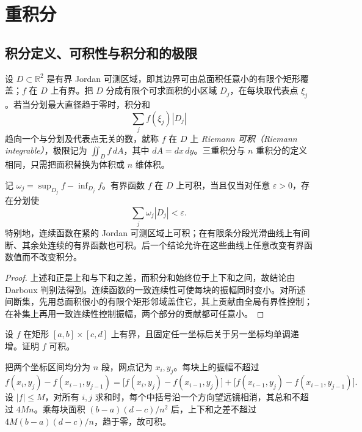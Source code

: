 \section{重积分}
\label{sec:pei-multiple-integrals}

\subsection{积分定义、可积性与积分和的极限}

设 $D\subset\mathbb R^2$ 是有界 Jordan 可测区域，即其边界可由总面积任意小的有限个矩形覆盖；$f$ 在 $D$ 上有界。把 $D$ 分成有限个可求面积的小区域 $D_j$，在每块取代表点 $\xi_j$。若当分划最大直径趋于零时，积分和
\[
\sum_j f(\xi_j)|D_j|
\]
趋向一个与分划及代表点无关的数，就称 $f$ 在 $D$ 上 \emph{Riemann 可积（Riemann integrable）}，极限记为 $\iint_Df\,dA$，其中 $dA=dx\,dy$。三重积分与 $n$ 重积分的定义相同，只需把面积替换为体积或 $n$ 维体积。

\begin{proposition}
\label{prop:pei-darboux-integrable}
记 $\omega_j=\sup_{D_j}f-\inf_{D_j}f$。有界函数 $f$ 在 $D$ 上可积，当且仅当对任意 $\varepsilon>0$，存在分划使
\[
\sum_j\omega_j|D_j|<\varepsilon.
\]
特别地，连续函数在紧的 Jordan 可测区域上可积；在有限条分段光滑曲线上有间断、其余处连续的有界函数也可积。后一个结论允许在这些曲线上任意改变有界函数值而不改变积分。
\end{proposition}
\begin{proof}
上述和正是上和与下和之差，而积分和始终位于上下和之间，故结论由 Darboux 判别法得到。连续函数的一致连续性可使每块的振幅同时变小。对所述间断集，先用总面积很小的有限个矩形邻域盖住它，其上贡献由全局有界性控制；在补集上再用一致连续性控制振幅，两个部分的贡献都可任意小。
\end{proof}

\begin{example}
\label{ex:pei-monotone-double-integrable}
设 $f$ 在矩形 $[a,b]\times[c,d]$ 上有界，且固定任一坐标后关于另一坐标均单调递增。证明 $f$ 可积。
\end{example}
\begin{solve}
把两个坐标区间均分为 $n$ 段，网点记为 $x_i,y_j$。每块上的振幅不超过
\[
f(x_i,y_j)-f(x_{i-1},y_{j-1})
=\bigl[f(x_i,y_j)-f(x_{i-1},y_j)\bigr]
+\bigl[f(x_{i-1},y_j)-f(x_{i-1},y_{j-1})\bigr].
\]
设 $|f|\le M$，对所有 $i,j$ 求和时，每个中括号沿一个方向望远镜相消，其总和不超过 $4Mn$。乘每块面积 $(b-a)(d-c)/n^2$ 后，上下和之差不超过 $4M(b-a)(d-c)/n$，趋于零，故可积。
\end{solve}

